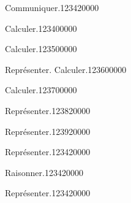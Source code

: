 \begin{pageAD} 
 

 
  
\begin{ExoCad}{Communiquer.}{1234}{2}{0}{0}{0}{0}

 
\end{ExoCad}


\begin{ExoCad}{Calculer.}{1234}{0}{0}{0}{0}{0}

 
 
\end{ExoCad}

\begin{ExoCad}{Calculer.}{1235}{0}{0}{0}{0}{0}

 
\end{ExoCad}



\begin{ExoCad}{Représenter. Calculer.}{1236}{0}{0}{0}{0}{0}

 
 
\end{ExoCad}

\begin{ExoCad}{Calculer.}{1237}{0}{0}{0}{0}{0}

 
\end{ExoCad}

 
\end{pageAD}


\begin{pageParcoursu} 

\begin{ExoCu}{Représenter.}{1238}{2}{0}{0}{0}{0}


\end{ExoCu}
\begin{ExoCu}{Représenter.}{1239}{2}{0}{0}{0}{0}


\end{ExoCu}
\begin{ExoCu}{Représenter.}{1234}{2}{0}{0}{0}{0}

\end{ExoCu}


\begin{ExoCu}{Raisonner.}{1234}{2}{0}{0}{0}{0}

\end{ExoCu}

\begin{ExoCu}{Représenter.}{1234}{2}{0}{0}{0}{0}


\end{ExoCu}


\end{pageParcoursu}

